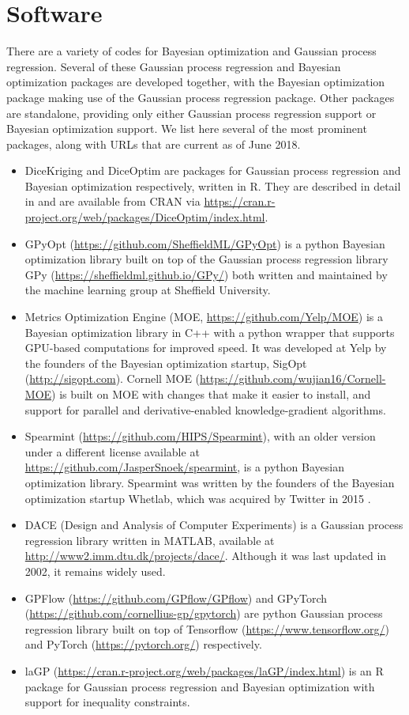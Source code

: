 \documentclass{article}
\begin{document}
\section{Software}
\label{sec:software}
There are a variety of codes for Bayesian optimization and Gaussian process regression.
Several of these Gaussian process regression and Bayesian optimization packages are developed together, with the Bayesian optimization package making use of the Gaussian process regression package.  Other packages are standalone, providing only either Gaussian process regression support or Bayesian optimization support.
We list here several of the most prominent packages, along with URLs that are current as of June 2018.
\begin{itemize}
\item DiceKriging and DiceOptim are packages for Gaussian process regression and Bayesian optimization respectively, written in R.  They are described in detail in \cite{JSSv051i01} and are available from CRAN via \url{https://cran.r-project.org/web/packages/DiceOptim/index.html}.
\item GPyOpt (\url{https://github.com/SheffieldML/GPyOpt}) is a python Bayesian optimization library built on top of the Gaussian process regression library GPy (\url{https://sheffieldml.github.io/GPy/}) both written and maintained by the machine learning group at Sheffield University.
\item Metrics Optimization Engine (MOE, \url{https://github.com/Yelp/MOE}) is a Bayesian optimization library in C++ with a python wrapper that supports GPU-based computations for improved speed.  It was developed at Yelp by the founders of the Bayesian optimization startup, SigOpt (\url{http://sigopt.com}).  Cornell MOE (\url{https://github.com/wujian16/Cornell-MOE}) is built on MOE with changes that make it easier to install, and support for parallel and derivative-enabled knowledge-gradient algorithms.
\item Spearmint (\url{https://github.com/HIPS/Spearmint}), with an older version under a different license available at \url{https://github.com/JasperSnoek/spearmint}, is a python Bayesian optimization library.  Spearmint was written by the founders of the Bayesian optimization startup Whetlab, which was acquired by Twitter in 2015 \cite{whetlab}.
\item DACE (Design and Analysis of Computer Experiments) is a Gaussian process regression library written in MATLAB, available at \url{http://www2.imm.dtu.dk/projects/dace/}.  Although it was last updated in 2002, it remains widely used.
\item GPFlow (\url{https://github.com/GPflow/GPflow}) and
GPyTorch (\url{https://github.com/cornellius-gp/gpytorch})
are python Gaussian process regression library built on top of Tensorflow (\url{https://www.tensorflow.org/}) 
and PyTorch (\url{https://pytorch.org/}) respectively.
\item laGP (\url{https://cran.r-project.org/web/packages/laGP/index.html}) is an R package for Gaussian process regression and Bayesian optimization with support for inequality constraints.
\end{itemize}
\end{document}

